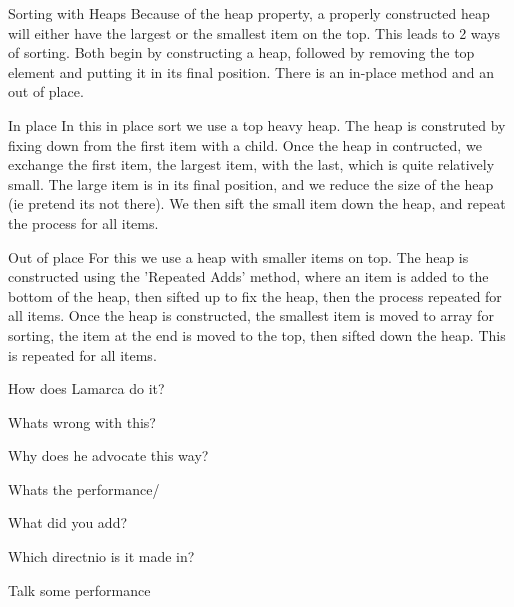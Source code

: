 Sorting with Heaps
Because of the heap property, a properly constructed heap will either have the
largest or the smallest item on the top. This leads to 2 ways of sorting. Both
begin by constructing a heap, followed by removing the top element and putting
it in its final position. There is an in-place method and an out of place.

In place
In this in place sort we use a top heavy heap. The heap is construted by fixing
down from the first item with a child. Once the heap in contructed, we
exchange the first item, the largest item, with the last, which is quite
relatively small. The large item is in its final position, and we reduce the
size of the heap (ie pretend its not there). We then sift the small item down the
heap, and repeat the process for all items.

Out of place
For this we use a heap with smaller items on top. The heap is constructed using
the 'Repeated Adds' method, where an item is added to the bottom of the heap,
then sifted up to fix the heap, then the process repeated for all items. Once
the heap is constructed,  the smallest item is moved to array for sorting, the
item at the end is moved to the top, then sifted down the heap. This is repeated
for all items.

How does Lamarca do it?

Whats wrong with this?

Why does he advocate this way?

Whats the performance/

What did you add?

Which directnio is it made in?

Talk some performance
